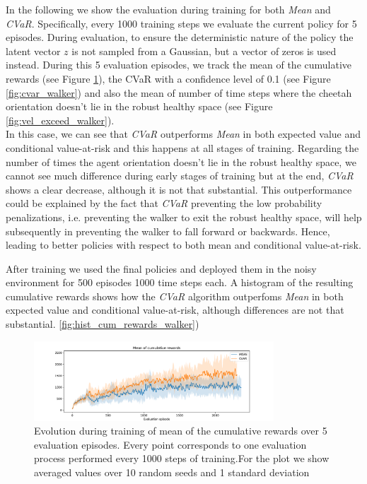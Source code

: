 In the following we show the evaluation during training for both \textit{Mean} and
\textit{CVaR}.
Specifically, every 1000 training steps we evaluate the current policy for 5 episodes.
During evaluation, to ensure the deterministic nature of the policy
the latent vector $z$ is not sampled from a Gaussian, but a vector of zeros is used instead.
During this 5 evaluation episodes, we track the mean of the cumulative rewards (see Figure \ref{fig:mean_walker}),
the CVaR with a confidence level of 0.1 (see Figure \ref{fig:cvar_walker}) and also the 
mean of number of time steps where the cheetah orientation doesn't lie in the robust healthy space (see Figure \ref{fig:vel_exceed_walker}).\\
In this case, we can see that \textit{CVaR} outperforms \textit{Mean} in both expected value and conditional value-at-risk
and this happens at all stages of training.
Regarding the number of times the agent orientation doesn't lie in the robust healthy space,
we cannot see much difference during early stages of training but at the end,
\textit{CVaR} shows a clear decrease, although it is not that substantial.
This outperformance could be explained by the fact that \textit{CVaR} preventing the low probability 
penalizations, i.e. preventing the walker
to exit the
robust healthy space, will help subsequently in preventing the walker to fall forward or backwards.
Hence, leading to better policies with respect to both mean and conditional value-at-risk. 

After training we used the final policies and deployed them in the noisy environment for 500 episodes 
1000 time steps each. A histogram of the resulting cumulative rewards shows
how the \textit{CVaR} algorithm outperfoms \textit{Mean} in both expected value and conditional value-at-risk,
although differences are not that substantial. \ref{fig:hist_cum_rewards_walker})


\begin{figure}[ht]
    \centering
    \includegraphics[width=0.8\textwidth]{images/Walker_offpolicy_expert/mean_train_withstds.pdf}
    \caption{Evolution during training of mean of the cumulative rewards over 5 evaluation episodes.
    Every point corresponds
    to one evaluation process performed every 1000 steps of training.For the plot we
    show averaged values over 10 random seeds and 1 standard deviation}
    \label{fig:mean_walker}
    
    \end{figure}

